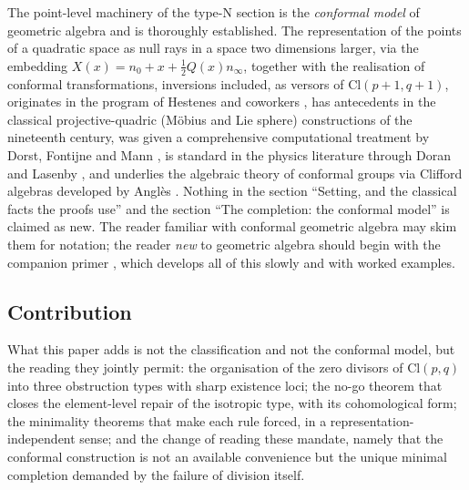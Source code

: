 \documentclass[11pt]{article}
\theoremstyle{definition}
\theoremstyle{plain}
\providecommand{\Cl}{}\renewcommand{\Cl}{\mathrm{Cl}}
\providecommand{\nInf}{}\renewcommand{\nInf}{n_\infty}
\providecommand{\nO}{}\renewcommand{\nO}{n_0}
\begin{document}
The point-level machinery of the type-N section is the \emph{conformal model} of geometric algebra and is thoroughly established. The representation of the points of a quadratic space as null rays in a space two dimensions larger, via the embedding $X(x) = \nO + x + \tfrac12 Q(x)\nInf$, together with the realisation of conformal transformations, inversions included, as versors of $\Cl(p{+}1,q{+}1)$, originates in the program of Hestenes and coworkers \cite{Hestenes2001, HLR2001}, has antecedents in the classical projective-quadric (M\"obius and Lie sphere) constructions of the nineteenth century, was given a comprehensive computational treatment by Dorst, Fontijne and Mann \cite{DFM2007}, is standard in the physics literature through Doran and Lasenby \cite{DoranLasenby2003}, and underlies the algebraic theory of conformal groups via Clifford algebras developed by Angl\`es \cite{Angles2008}. Nothing in the section ``Setting, and the classical facts the proofs use'' and the section ``The completion: the conformal model'' is claimed as new. The reader familiar with conformal geometric algebra may skim them for notation; the reader \emph{new} to geometric algebra should begin with the companion primer \cite{ButlerT0}, which develops all of this slowly and with worked examples.

\subsection*{Contribution}
\label{c:note.transport.setting-contribution}
What this paper adds is not the classification and not the conformal model, but the reading they jointly permit: the organisation of the zero divisors of $\Cl(p,q)$ into three obstruction types with sharp existence loci; the no-go theorem that closes the element-level repair of the isotropic type, with its cohomological form; the minimality theorems that make each rule forced, in a representation-independent sense; and the change of reading these mandate, namely that the conformal construction is not an available convenience but the unique minimal completion demanded by the failure of division itself.
\end{document}
